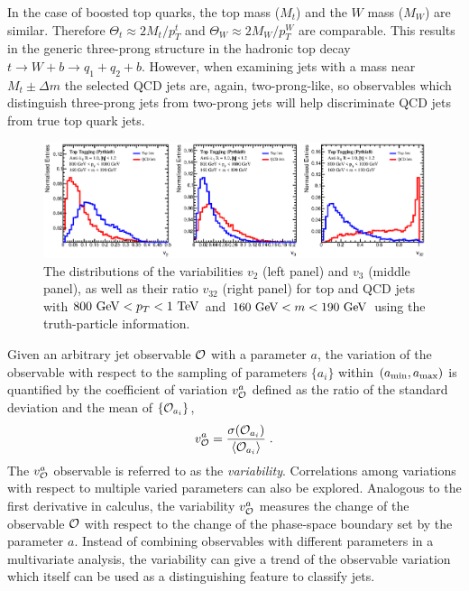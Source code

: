 \documentclass[aps,prl,floatfix,preprintnumbers,twocolumn,groupedaddress,nofootinbib]{revtex4-1}
\newcommand{\be}{\begin{equation}}
\newcommand{\ee}{\end{equation}}
\begin{document}
In the case of boosted top quarks, the top mass ($M_t$) and the $W$ mass ($M_W$) are similar. Therefore $\Theta_t \approx 2M_t/p_T^t$ and $\Theta_W \approx 2M_W/p_T^W$ are comparable. This results in the generic three-prong structure in the hadronic top decay $t\rightarrow W+b \rightarrow q_1+q_2+b$. However, when examining jets with a mass near $M_t\pm \Delta m$ the selected QCD jets are, again, two-prong-like, so observables which distinguish three-prong jets from two-prong jets will help discriminate QCD jets from true top quark jets.

\begin{figure}
    \includegraphics[width=2\columnwidth]{plots/Top_vs_high.eps}
    \caption{The distributions of the variabilities $v_2$ (left panel) and $v_3$ (middle panel), as well as their ratio $v_{32}$ (right panel) for top and QCD jets with $800~{\rm GeV} < p_T < 1~{\rm TeV}$ and $160~{\rm GeV} < m < 190~{\rm GeV}$ using the truth-particle information.}
\label{v42}
\end{figure}

Given an arbitrary jet observable $\cal O$ with a parameter $a$,
the variation of the observable with respect to the sampling of parameters $\{a_i\}$ within $(a_{\rm min},a_{\rm max})$ is quantified by the coefficient of variation $v_{\cal O}^a$ defined as the ratio of the standard deviation and the mean of $\{{\cal O}_{a_i}\}$,
\be
    v_{\cal O}^a = \frac{\sigma({\cal O}_{a_i})}{\langle {\cal O}_{a_i}\rangle}\;.
\ee
The $v_{\cal O}^a$ observable is referred to as the {\sl variability}. Correlations among variations with respect to multiple varied parameters can also be explored. Analogous to the first derivative in calculus, the variability $v_{\cal O}^a$ measures the change of the observable $\cal O$ with respect to the change of the phase-space boundary set by the parameter $a$. Instead of combining observables with different parameters in a multivariate analysis, the variability can give a trend of the observable variation which itself can be used as a distinguishing feature to classify jets.
\end{document}
